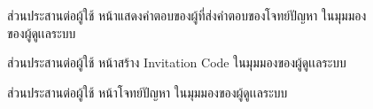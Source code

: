\documentclass[12pt,one side,openright,a4paper]{cpe-thesis-th}
\begin{document}
\pagebreak
{}
\begin{figure}[H]
\centering
    \caption[ส่วนประสานต่อผู้ใช้ หน้าแสดงคำตอบของผู้ที่ส่งคำตอบของโจทย์ปัญหา]{ส่วนประสานต่อผู้ใช้ หน้าแสดงคำตอบของผู้ที่ส่งคำตอบของโจทย์ปัญหา ในมุมมองของผู้ดูเเลระบบ}
\end{figure}

\begin{figure}[H]
\centering
    \caption[ส่วนประสานต่อผู้ใช้ หน้าสร้าง Invitation Code]{ส่วนประสานต่อผู้ใช้ หน้าสร้าง Invitation Code ในมุมมองของผู้ดูเเลระบบ}
    \label{fig:new-ui-setting-invitation2}
\end{figure}

\begin{figure}[H]
    \centering
    \caption[ส่วนประสานต่อผู้ใช้ หน้าโจทย์ปัญหาของผู้ดูเเลระบบ]{ส่วนประสานต่อผู้ใช้ หน้าโจทย์ปัญหา ในมุมมองของผู้ดูเเลระบบ}
    \label{fig:new-ui-assign8}
\end{figure}
\end{document}
